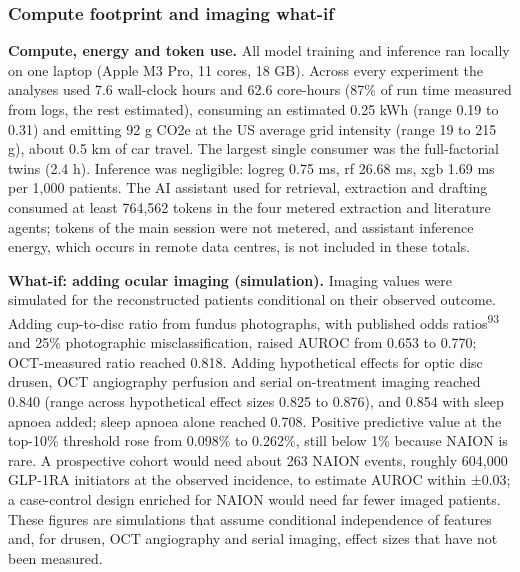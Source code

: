\documentclass[
  11pt,
]{article}
\begin{document}
\subsubsection{Compute footprint and imaging
what-if}\label{compute-footprint-and-imaging-what-if}

\textbf{Compute, energy and token use.} All model training and inference
ran locally on one laptop (Apple M3 Pro, 11 cores, 18 GB). Across every
experiment the analyses used 7.6 wall-clock hours and 62.6 core-hours
(87\% of run time measured from logs, the rest estimated), consuming an
estimated 0.25 kWh (range 0.19 to 0.31) and emitting 92 g CO2e at the US
average grid intensity (range 19 to 215 g), about 0.5 km of car travel.
The largest single consumer was the full-factorial twins (2.4 h).
Inference was negligible: logreg 0.75 ms, rf 26.68 ms, xgb 1.69 ms per
1,000 patients. The AI assistant used for retrieval, extraction and
drafting consumed at least 764,562 tokens in the four metered extraction
and literature agents; tokens of the main session were not metered, and
assistant inference energy, which occurs in remote data centres, is not
included in these totals.

\textbf{What-if: adding ocular imaging (simulation).} Imaging values
were simulated for the reconstructed patients conditional on their
observed outcome. Adding cup-to-disc ratio from fundus photographs, with
published odds ratios\textsuperscript{93} and 25\% photographic
misclassification, raised AUROC from 0.653 to 0.770; OCT-measured ratio
reached 0.818. Adding hypothetical effects for optic disc drusen, OCT
angiography perfusion and serial on-treatment imaging reached 0.840
(range across hypothetical effect sizes 0.825 to 0.876), and 0.854 with
sleep apnoea added; sleep apnoea alone reached 0.708. Positive
predictive value at the top-10\% threshold rose from 0.098\% to 0.262\%,
still below 1\% because NAION is rare. A prospective cohort would need
about 263 NAION events, roughly 604,000 GLP-1RA initiators at the
observed incidence, to estimate AUROC within ±0.03; a case-control
design enriched for NAION would need far fewer imaged patients. These
figures are simulations that assume conditional independence of features
and, for drusen, OCT angiography and serial imaging, effect sizes that
have not been measured.
\end{document}
